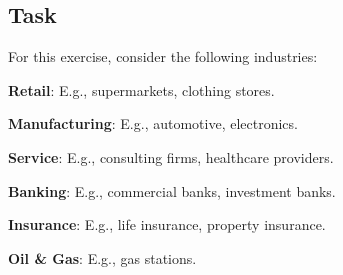 \documentclass[11pt,a4paper,openany]{memoir}
\begin{document}
\subsection*{Task}
For this exercise, consider the following industries:
\begin{compactitem}
    \item \textbf{Retail}: E.g., supermarkets, clothing stores.
    \item \textbf{Manufacturing}: E.g., automotive, electronics.
    \item \textbf{Service}: E.g., consulting firms, healthcare providers.
    \item \textbf{Banking}: E.g., commercial banks, investment banks.
    \item \textbf{Insurance}: E.g., life insurance, property insurance.
    \item \textbf{Oil \& Gas}: E.g., gas stations.
\end{compactitem}
\end{document}
